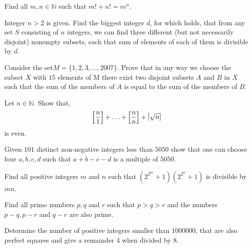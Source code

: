 \documentclass[problems.tex]{subfile}
\begin{document}
	\begin{problem}[Belarus $2009$]
		Find all $m,n\in\mathbb{N}$ such that $m!+n!=m^n$.
	\end{problem}

	\begin{problem}
		Integer $n>2$ is given. Find the biggest integer $d$, for which holds, that from any set $S$ consisting of $n$ integers, we can find three different (but not necessarily disjoint) nonempty subsets, such that sum of elements of each of them is divisible by $d$.
	\end{problem}

	\begin{problem}
		Consider the set$ M = \{1, 2, 3, . . . , 2007\}$. Prove that in any way we choose the subset $X$ with $15$ elements of M there exist two disjoint subsets         $A$ and $B$ in $X$ such that the sum of the members of $A$ is equal to the sum of the members of $B$.
	\end{problem}

	\begin{problem}[India $2014$]
		Let $n\in\mathbb{N}$. Show that,
			\begin{align*}
				\floor{\dfrac{n}{1}}+\ldots+\floor{\dfrac{n}{n}}+\floor{\sqrt{n}}
			\end{align*}
		is even.
	\end{problem}

	\begin{problem}
		Given $101$ distinct non-negative integers less than $5050$ show that one can choose four $a, b, c, d$ such that $a + b - c - d$ is a multiple of $5050$.
	\end{problem}

	\begin{problem}
		Find all positive integers $m$ and $n$ such that $\left(2^{2^m}+1\right)\left(2^{2^n}+1\right)$ is divisible by $mn$.
	\end{problem}

	\begin{problem}[Slovenia $2010$]
		Find all prime numbers $p, q$ and $r$ such that $p > q > r$ and the numbers $p-q,p-r$ and $q-r$ are also prime.
	\end{problem}

	\begin{problem}
		Determine the number of positive integers smaller than $1000000$, that are also perfect squares and give a remainder $4$ when divided by $8$.
	\end{problem}
\end{document}
